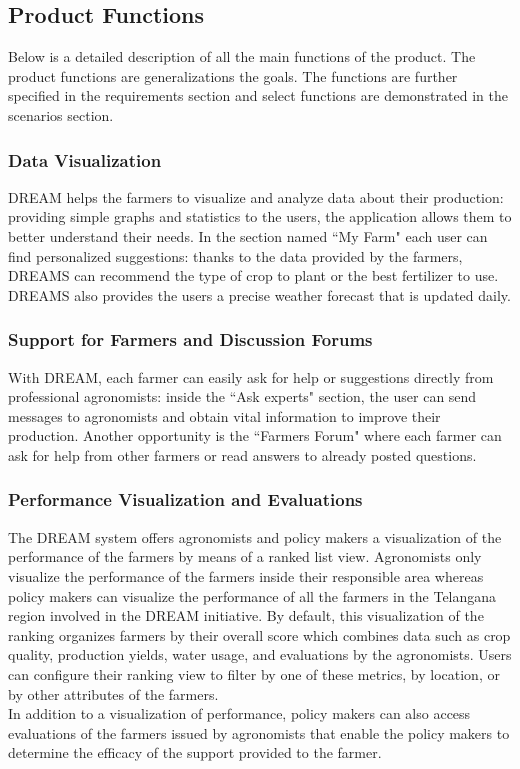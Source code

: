 \subsection{Product Functions}
\begin{flushleft}

Below is a detailed description of all the main functions of the product. The product functions are generalizations the goals. The functions are further specified in the requirements section and select functions are demonstrated in the scenarios section. 

\subsubsection{Data Visualization}
DREAM helps the farmers to visualize and analyze data about their production: providing simple graphs and statistics to the users, the application allows them to better understand their needs. In the section named “My Farm" each user can find personalized suggestions: thanks to the data provided by the farmers, DREAMS can recommend the type of crop to plant or the best fertilizer to use. DREAMS also provides the users a precise weather forecast that is updated daily.

\subsubsection{Support for Farmers and Discussion Forums}
With DREAM, each farmer can easily ask for help or suggestions directly from professional agronomists: inside the “Ask experts" section, the user can send messages to agronomists and obtain vital information to improve their production. Another opportunity is the “Farmers Forum" where each farmer can ask for help from other farmers or read answers to already posted questions.

\subsubsection{Performance Visualization and Evaluations}
The DREAM system offers agronomists and policy makers a visualization of the performance of the farmers by means of a ranked list view. Agronomists only visualize the performance of the farmers inside their responsible area whereas policy makers can visualize the performance of all the farmers in the Telangana region involved in the DREAM initiative. By default, this visualization of the ranking organizes farmers by their overall score which combines data such as crop quality, production yields, water usage, and evaluations by the agronomists. Users can configure their ranking view to filter by one of these metrics, by location, or by other attributes of the farmers. \\
\smallskip
In addition to a visualization of performance, policy makers can also access evaluations of the farmers issued by agronomists that enable the policy makers to determine the efficacy of the support provided to the farmer. 


\end{flushleft}

